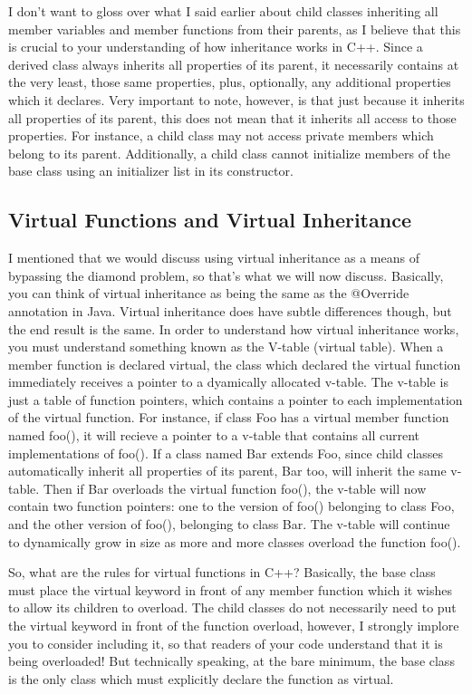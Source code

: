 \documentclass{article}
\begin{document}
I don't want to gloss over what I said earlier about child classes inheriting all member variables and member
functions from their parents, as I believe that this is crucial to your understanding of how inheritance works
in C++. Since a derived class always inherits all properties of its parent, it necessarily contains at the
very least, those same properties, plus, optionally, any additional properties which it declares. Very important
to note, however, is that just because it inherits all properties of its parent, this does not mean that it
inherits all access to those properties. For instance, a child class may not access private members which belong
to its parent. Additionally, a child class cannot initialize members of the base class using an initializer list
in its constructor.

\subsection{Virtual Functions and Virtual Inheritance}

I mentioned that we would discuss using virtual inheritance as a means of bypassing the diamond problem, so
that's what we will now discuss. Basically, you can think of virtual inheritance as being the same as the
@Override annotation in Java. Virtual inheritance does have subtle differences though, but the end result is the
same. In order to understand how virtual inheritance works, you must understand something known as the V-table
(virtual table). When a member function is declared virtual, the class which declared the virtual function
immediately receives a pointer to a dyamically allocated v-table. The v-table is just a table of function
pointers, which contains a pointer to each implementation of the virtual function. For instance, if class Foo
has a virtual member function named foo(), it will recieve a pointer to a v-table that contains all current
implementations of foo(). If a class named Bar extends Foo, since child classes automatically inherit all
properties of its parent, Bar too, will inherit the same v-table. Then if Bar overloads the virtual function
foo(), the v-table will now contain two function pointers: one to the version of foo() belonging to class Foo,
and the other version of foo(), belonging to class Bar. The v-table will continue to dynamically grow in size
as more and more classes overload the function foo().

So, what are the rules for virtual functions in C++? Basically, the base class must place the virtual keyword
in front of any member function which it wishes to allow its children to overload. The child classes do not
necessarily need to put the virtual keyword in front of the function overload, however, I strongly implore you
to consider including it, so that readers of your code understand that it is being overloaded! But technically
speaking, at the bare minimum, the base class is the only class which must explicitly declare the function as
virtual.
\end{document}
